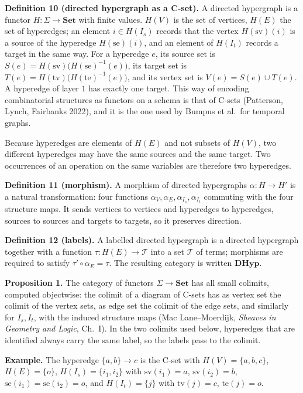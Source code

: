 \documentclass[11pt]{article}
\begin{document}
\textbf{Definition 10 (directed hypergraph as a C-set).} A directed hypergraph is a functor $H:\Sigma\to\mathbf{Set}$ with finite values. $H(V)$ is the set of vertices, $H(E)$ the set of hyperedges; an element $i\in H(I_s)$ records that the vertex $H(\mathrm{sv})(i)$ is a source of the hyperedge $H(\mathrm{se})(i)$, and an element of $H(I_t)$ records a target in the same way. For a hyperedge $e$, its source set is $S(e)=H(\mathrm{sv})\big(H(\mathrm{se})^{-1}(e)\big)$, its target set is $T(e)=H(\mathrm{tv})\big(H(\mathrm{te})^{-1}(e)\big)$, and its vertex set is $V(e)=S(e)\cup T(e)$. A hyperedge of layer $1$ has exactly one target. This way of encoding combinatorial structures as functors on a schema is that of C-sets (Patterson, Lynch, Fairbanks 2022), and it is the one used by Bumpus et al.\ for temporal graphs.

Because hyperedges are elements of $H(E)$ and not subsets of $H(V)$, two different hyperedges may have the same sources and the same target. Two occurrences of an operation on the same variables are therefore two hyperedges.

\textbf{Definition 11 (morphism).} A morphism of directed hypergraphs $\alpha:H\to H'$ is a natural transformation: four functions $\alpha_V,\alpha_E,\alpha_{I_s},\alpha_{I_t}$ commuting with the four structure maps. It sends vertices to vertices and hyperedges to hyperedges, sources to sources and targets to targets, so it preserves direction.

\textbf{Definition 12 (labels).} A labelled directed hypergraph is a directed hypergraph together with a function $\tau:H(E)\to\mathcal{T}$ into a set $\mathcal{T}$ of terms; morphisms are required to satisfy $\tau'\circ\alpha_E=\tau$. The resulting category is written $\mathbf{DHyp}$.

\textbf{Proposition 1.} The category of functors $\Sigma\to\mathbf{Set}$ has all small colimits, computed objectwise: the colimit of a diagram of C-sets has as vertex set the colimit of the vertex sets, as edge set the colimit of the edge sets, and similarly for $I_s,I_t$, with the induced structure maps (Mac Lane--Moerdijk, \emph{Sheaves in Geometry and Logic}, Ch.~I). In the two colimits used below, hyperedges that are identified always carry the same label, so the labels pass to the colimit.

\textbf{Example.} The hyperedge $\{a,b\}\to c$ is the C-set with $H(V)=\{a,b,c\}$, $H(E)=\{o\}$, $H(I_s)=\{i_1,i_2\}$ with $\mathrm{sv}(i_1)=a$, $\mathrm{sv}(i_2)=b$, $\mathrm{se}(i_1)=\mathrm{se}(i_2)=o$, and $H(I_t)=\{j\}$ with $\mathrm{tv}(j)=c$, $\mathrm{te}(j)=o$.
\end{document}
